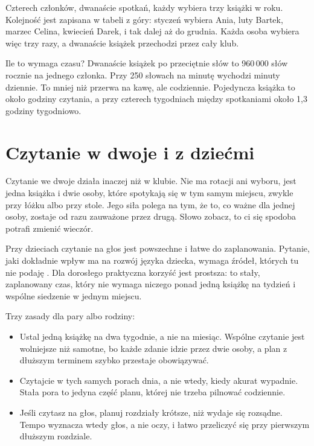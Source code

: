 \begin{przyklad}
Czterech członków, dwanaście spotkań, każdy wybiera trzy książki w roku. Kolejność jest zapisana w tabeli z góry: styczeń wybiera Ania, luty Bartek, marzec Celina, kwiecień Darek, i tak dalej aż do grudnia. Każda osoba wybiera więc trzy razy, a dwanaście książek przechodzi przez cały klub.

Ile to wymaga czasu? Dwanaście książek po przeciętnie  słów to 960\,000 słów rocznie na jednego członka. Przy 250 słowach na minutę wychodzi  minuty dziennie. To mniej niż przerwa na kawę, ale codziennie. Pojedyncza książka to około  godziny czytania, a przy czterech tygodniach między spotkaniami około 1,3 godziny tygodniowo.
\end{przyklad}

\section{Czytanie w dwoje i z dziećmi}

Czytanie we dwoje działa inaczej niż w klubie. Nie ma rotacji ani wyboru, jest jedna książka i dwie osoby, które spotykają się w tym samym miejscu, zwykle przy łóżku albo przy stole. Jego siła polega na tym, że to, co ważne dla jednej osoby, zostaje od razu zauważone przez drugą. Słowo \glqq zobacz, to ci się spodoba\grqq{} potrafi zmienić wieczór.

Przy dzieciach czytanie na głos jest powszechne i łatwe do zaplanowania. Pytanie, jaki dokładnie wpływ ma na rozwój języka dziecka, wymaga źródeł, których tu nie podaję . Dla dorosłego praktyczna korzyść jest prostsza: to stały, zaplanowany czas, który nie wymaga niczego ponad jedną książkę na tydzień i wspólne siedzenie w jednym miejscu.

Trzy zasady dla pary albo rodziny:
\begin{itemize}
\item Ustal jedną książkę na dwa tygodnie, a nie na miesiąc. Wspólne czytanie jest wolniejsze niż samotne, bo każde zdanie idzie przez dwie osoby, a plan z dłuższym terminem szybko przestaje obowiązywać.
\item Czytajcie w tych samych porach dnia, a nie wtedy, kiedy akurat wypadnie. Stała pora to jedyna część planu, której nie trzeba pilnować codziennie.
\item Jeśli czytasz na głos, planuj rozdziały krótsze, niż wydaje się rozsądne. Tempo wyznacza wtedy głos, a nie oczy, i łatwo przeliczyć się przy pierwszym dłuższym rozdziale.
\end{itemize}

